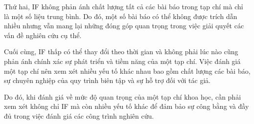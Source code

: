 Thứ hai, IF không phản ánh chất lượng tất cả các bài báo trong tạp chí mà chỉ là một số liệu trung bình. Do đó, một số bài báo có thể không được trích dẫn nhiều nhưng vẫn mang lại những đóng góp quan trọng trong việc giải quyết các vấn đề nghiên cứu cụ thể.

Cuối cùng, IF thấp có thể thay đổi theo thời gian và không phải lúc nào cũng phản ánh chính xác sự phát triển và tiềm năng của một tạp chí. Việc đánh giá một tạp chí nên xem xét nhiều yếu tố khác nhau bao gồm chất lượng các bài báo, sự chuyên nghiệp của quy trình biên tập và sự hỗ trợ đối với tác giả.

Do đó, khi đánh giá về mức độ quan trọng của một tạp chí khoa học, cần phải xem xét không chỉ IF mà còn nhiều yếu tố khác để đảm bảo sự công bằng và đầy đủ trong việc đánh giá các công trình nghiên cứu.